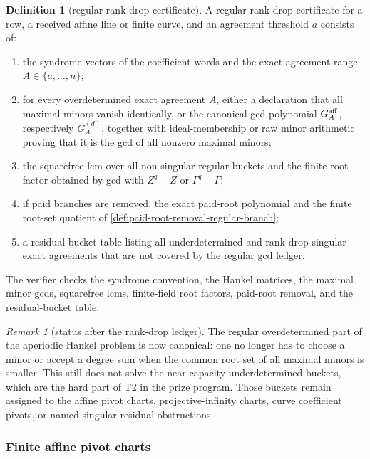 \documentclass[11pt]{article}
\theoremstyle{definition}
\newtheorem{definition}[theorem]{Definition}
\theoremstyle{remark}
\newtheorem{remark}[theorem]{Remark}
\begin{document}
\begin{definition}[regular rank-drop certificate]
\label{def:regular-rankdrop-certificate}
A regular rank-drop certificate for a row, a received affine line or finite
curve, and an agreement threshold $a$ consists of:
\begin{enumerate}[label=\textup{(\roman*)},leftmargin=2.2em]
\item the syndrome vectors of the coefficient words and the exact-agreement range
$A\in\{a,\ldots,n\}$;
\item for every overdetermined exact agreement $A$, either a declaration that all
maximal minors vanish identically, or the canonical gcd polynomial
$G_A^{\rm aff}$, respectively $G_A^{(d)}$, together with ideal-membership or raw
minor arithmetic proving that it is the gcd of all nonzero maximal minors;
\item the squarefree lcm over all non-singular regular buckets and the finite-root
factor obtained by gcd with $Z^q-Z$ or $\Gamma^q-\Gamma$;
\item if paid branches are removed, the exact paid-root polynomial and the finite
root-set quotient of \cref{def:paid-root-removal-regular-branch};
\item a residual-bucket table listing all underdetermined and rank-drop singular
exact agreements that are not covered by the regular gcd ledger.
\end{enumerate}
The verifier checks the syndrome convention, the Hankel matrices, the maximal
minor gcds, squarefree lcms, finite-field root factors, paid-root removal, and the
residual-bucket table.
\end{definition}

\begin{remark}[status after the rank-drop ledger]
\label{rem:rankdrop-ledger-status}
The regular overdetermined part of the aperiodic Hankel problem is now canonical:
one no longer has to choose a minor or accept a degree sum when the common root
set of all maximal minors is smaller.  This still does not solve the near-capacity
underdetermined buckets, which are the hard part of T2 in the prize program.
Those buckets remain assigned to the affine pivot charts, projective-infinity
charts, curve coefficient pivots, or named singular residual obstructions.
\end{remark}

\subsubsection{Finite affine pivot charts}
\end{document}
